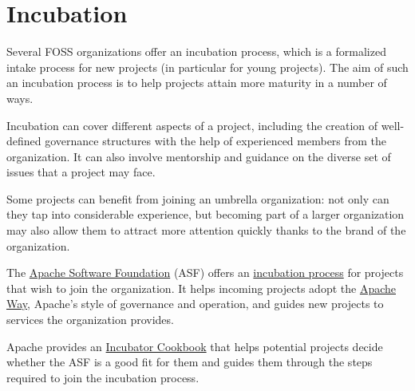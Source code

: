 


\chapter{Incubation}

Several FOSS organizations offer an incubation process, which is a formalized intake process for new projects (in particular for young projects).  The aim of such an incubation process is to help projects attain more maturity in a number of ways.

Incubation can cover different aspects of a project, including the creation of well-defined governance structures with the help of experienced members from the organization.  It can also involve mentorship and guidance on the diverse set of issues that a project may face.

Some projects can benefit from joining an umbrella organization: not only can they tap into considerable experience, but becoming part of a larger organization may also allow them to attract more attention quickly thanks to the brand of the organization.

\begin{kaobox}[frametitle=Apache Incubator]

The \href{https://apache.org/}{Apache Software Foundation} (ASF) offers an \href{https://incubator.apache.org/}{incubation process} for projects that wish to join the organization.  It helps incoming projects adopt the \href{https://apache.org/theapacheway/}{Apache Way}, Apache's style of governance and operation, and guides new projects to services the organization provides.

Apache provides an \href{https://incubator.apache.org/cookbook/}{Incubator Cookbook} that helps potential projects decide whether the ASF is a good fit for them and guides them through the steps required to join the incubation process.

\end{kaobox}

